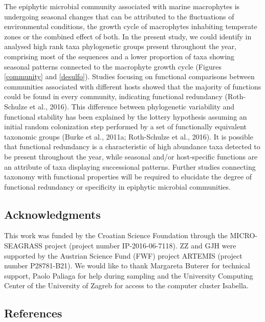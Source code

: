 \documentclass[
  12pt,
]{article}
\begin{document}
The epiphytic microbial community associated with marine macrophytes is
undergoing seasonal changes that can be attributed to the fluctuations
of environmental conditions, the growth cycle of macrophytes inhabiting
temperate zones or the combined effect of both. In the present study, we
could identify in analysed high rank taxa phylogenetic groups present
throughout the year, comprising most of the sequences and a lower
proportion of taxa showing seasonal patterns connected to the macrophyte
growth cycle (Figures \ref{community} and \ref{desulfo}). Studies
focusing on functional comparisons between communities associated with
different hosts showed that the majority of functions could be found in
every community, indicating functional redundancy (Roth-Schulze et al.,
2016). This difference between phylogenetic variability and functional
stability has been explained by the lottery hypothesis assuming an
initial random colonization step performed by a set of functionally
equivalent taxonomic groups (Burke et al., 2011a; Roth-Schulze et al.,
2016). It is possible that functional redundancy is a characteristic of
high abundance taxa detected to be present throughout the year, while
seasonal and/or host-specific functions are an attribute of taxa
displaying successional patterns. Further studies connecting taxonomy
with functional properties will be required to elucidate the degree of
functional redundancy or specificity in epiphytic microbial communities.

\newpage

\hypertarget{acknowledgments}{%
\subsection{Acknowledgments}\label{acknowledgments}}

This work was funded by the Croatian Science Foundation through the
MICRO-SEAGRASS project (project number IP-2016-06-7118). ZZ and GJH were
supported by the Austrian Science Fund (FWF) project ARTEMIS (project
number P28781-B21). We would like to thank Margareta Buterer for
technical support, Paolo Paliaga for help during sampling and the
University Computing Center of the University of Zagreb for access to
the computer cluster Isabella.

\newpage

\hypertarget{references}{%
\subsection{References}\label{references}}
\end{document}
